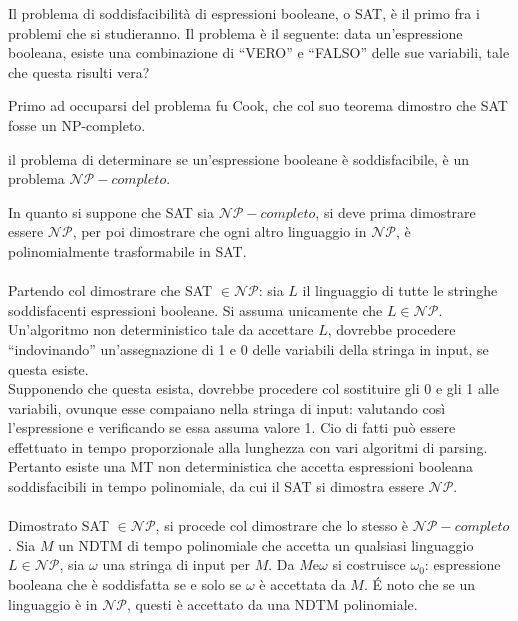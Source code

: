 \documentclass{subfiles}
\begin{document}
Il problema di soddisfacibilità di espressioni booleane, o SAT, è il primo fra i problemi che si studieranno.
Il problema è il seguente: data un'espressione booleana, esiste una combinazione di ``VERO'' e ``FALSO'' delle sue variabili, tale che questa risulti vera?

Primo ad occuparsi del problema fu Cook, che col suo teorema dimostro che SAT fosse un NP-completo.

\begin{Theorem*}[di Cook]
    il problema di determinare se un'espressione booleane è soddisfacibile, è un problema \(\mathcal{NP}-completo\).

    \begin{Proof*}
        In quanto si suppone che SAT sia \(\mathcal{NP}-completo\), si deve prima dimostrare essere \(\mathcal{NP}\),
        per poi dimostrare che ogni altro linguaggio in \(\mathcal{NP}\), è polinomialmente trasformabile in SAT.
        \\ \\
        Partendo col dimostrare che SAT \(\in \mathcal{NP}\): sia \(L\) il linguaggio di tutte le stringhe soddisfacenti espressioni booleane.
        Si assuma unicamente che \(L \in \mathcal{NP}\). Un'algoritmo non deterministico tale da accettare \(L\),
        dovrebbe procedere ``indovinando'' un'assegnazione di 1 e 0 delle variabili della stringa in input, se questa esiste.
        \\
        Supponendo che questa esista, dovrebbe procedere col sostituire gli 0 e gli 1 alle variabili, ovunque esse compaiano nella stringa di input:
        valutando così l'espressione e verificando se essa assuma valore 1. Cio di fatti può essere effettuato in tempo proporzionale alla lunghezza con vari algoritmi di parsing.
        Pertanto esiste una MT non deterministica che accetta espressioni booleana soddisfacibili in tempo polinomiale, da cui il SAT si dimostra essere \(\mathcal{NP}\).
        \\ \\
        Dimostrato SAT \(\in \mathcal{NP}\), si procede col dimostrare che lo stesso è \(\mathcal{NP}-completo\).
        Sia \(M\) un NDTM di tempo polinomiale che accetta un qualsiasi linguaggio \(L \in \mathcal{NP}\), sia \(\omega\) una stringa di input per \(M\).
        Da \(M \text{e} \omega\) si costruisce \(\omega_{0}\): espressione booleana che è soddisfatta se e solo se \(\omega\) è accettata da \(M\).
        \'E noto che se un linguaggio è in \(\mathcal{NP}\), questi è accettato da una NDTM polinomiale.

\end{Proof*}
\end{Theorem*}
\end{document}

